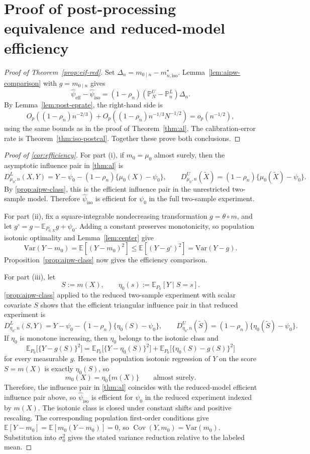 \documentclass{article}
\theoremstyle{plain}
\theoremstyle{definition}
\newcommand{\E}{\mathbb{E}}
\newcommand{\Var}{\mathrm{Var}}
\newcommand{\1}{\mathbbm{1}}
\newcommand{\mhat}{m}
\newcommand{\rhon}{\rho_n}
\newcommand{\muzero}{\mu_0}
\newcommand{\Pl}{\mathbb{P}^{L}_n}
\newcommand{\Pu}{\mathbb{P}^{U}_N}
\newcommand{\Px}{P_{0,X}}
\newcommand{\Cov}{\operatorname{Cov}}
\begin{document}
\section{Proof of post-processing equivalence and reduced-model efficiency}
\label{app:eff}

\begin{proof}[Proof of Theorem~\ref{prop:eif-red}]
Set \(\Delta_n=m_{0\mid n}-m_{n,\mathrm{iso}}^\star\).
Lemma~\ref{lem:aipw-comparison} with \(g=m_{0\mid n}\) gives
\[
\widehat\psi_{\mathrm{eff}}-\widehat\psi_{\mathrm{iso}}
=(1-\rhon)(\Pu-\Pl)\Delta_n.
\]
By Lemma~\ref{lem:post-eprate}, the right-hand side is
\[
O_p((1-\rhon)n^{-2/3})
+O_p((1-\rhon)n^{-1/3}N^{-1/2})
=o_p(n^{-1/2}),
\]
using the same bounds as in the proof of Theorem~\ref{thm:al}.
The calibration-error rate is Theorem~\ref{thm:iso-postcal}.
Together these prove both conclusions.
\end{proof}

\begin{proof}[Proof of \cref{cor:efficiency}]
For part (i), if \(m_0=\muzero\) almost surely, then the asymptotic influence pair in \cref{thm:al} is
\[
D_{\mu_0,n}^L(X,Y)
=
Y-\psi_0-(1-\rhon)\{\mu_0(X)-\psi_0\},
\qquad
D_{\mu_0,n}^U(\widetilde X)
=
(1-\rhon)\{\mu_0(\widetilde X)-\psi_0\}.
\]
By \cref{prop:aipw-class}, this is the efficient influence pair in the unrestricted two-sample model. Therefore \(\widehat{\psi}_{\mathrm{iso}}\) is efficient for \(\psi_0\) in the full two-sample experiment.

For part (ii), fix a square-integrable nondecreasing transformation
\(g=\theta\circ\mhat\), and let \(g^\circ=g-\E_{\Px}g+\psi_0\).
Adding a constant preserves monotonicity, so population isotonic optimality
and Lemma~\ref{lem:center} give
\[
\Var(Y-m_0)=\E[(Y-m_0)^2]
\le\E[(Y-g^\circ)^2]=\Var(Y-g).
\]
Proposition~\ref{prop:aipw-class} now gives the efficiency comparison.

For part (iii), let
\[
S:=\mhat(X),
\qquad
\eta_0(s):=\E_{P_0}[Y\mid S=s].
\]
\cref{prop:aipw-class} applied to the reduced two-sample experiment with scalar covariate \(S\) shows that the efficient triangular influence pair in that reduced experiment is
\[
D_{\eta_0,n}^L(S,Y)
=
Y-\psi_0-(1-\rhon)\{\eta_0(S)-\psi_0\},
\qquad
D_{\eta_0,n}^U(\widetilde S)
=
(1-\rhon)\{\eta_0(\widetilde S)-\psi_0\}.
\]
If \(\eta_0\) is monotone increasing, then \(\eta_0\) belongs to the isotonic class and
\[
\E_{P_0}\bigl[\{Y-g(S)\}^2\bigr]
=
\E_{P_0}\bigl[\{Y-\eta_0(S)\}^2\bigr]
+
\E_{P_0}\bigl[\{\eta_0(S)-g(S)\}^2\bigr]
\]
for every measurable \(g\). Hence the population isotonic regression of \(Y\) on the score \(S=\mhat(X)\) is exactly \(\eta_0(S)\), so
\[
m_0(X)=\eta_0\{\mhat(X)\}
\qquad\text{almost surely.}
\]
Therefore, the influence pair in \cref{thm:al} coincides with the reduced-model efficient influence pair above, so \(\widehat{\psi}_{\mathrm{iso}}\) is efficient for \(\psi_0\) in the reduced experiment indexed by \(\mhat(X)\).
The isotonic class is closed under constant shifts and positive rescaling.
The corresponding population first-order conditions give
\(\E[Y-m_0]=\E[m_0(Y-m_0)]=0\), so
\(\Cov(Y,m_0)=\Var(m_0)\).
Substitution into \(\sigma_0^2\) gives the stated variance reduction relative
to the labeled mean.
\end{proof}
\end{document}
